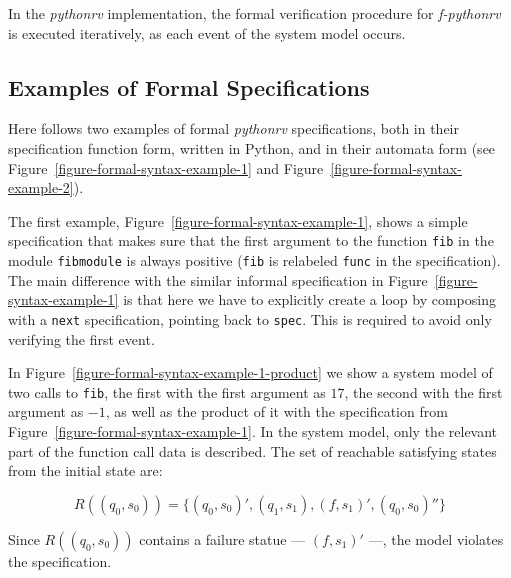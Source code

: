 In the \textit{pythonrv} implementation, the formal verification procedure for
\textit{f-pythonrv} is executed iteratively, as each event of the system model
occurs.





\subsection{Examples of Formal Specifications}
\label{section-approach-examples-of-formal-specifications}
\lstset{language=Python,numbers=none}


Here follows two examples of formal \textit{pythonrv} specifications, both in
their specification function form, written in Python, and in their automata
form (see Figure~\ref{figure-formal-syntax-example-1} and
Figure~\ref{figure-formal-syntax-example-2}).

The first example, Figure~\ref{figure-formal-syntax-example-1}, shows a simple
specification that makes sure that the first argument to the function
\texttt{fib} in the module \texttt{fibmodule} is always positive (\texttt{fib}
is relabeled \texttt{func} in the specification). The main difference with the
similar informal specification in Figure~\ref{figure-syntax-example-1} is that
here we have to explicitly create a loop by composing with a \texttt{next}
specification, pointing back to \texttt{spec}. This is required to avoid only
verifying the first event.

In Figure~\ref{figure-formal-syntax-example-1-product} we show a system model
of two calls to \texttt{fib}, the first with the first argument as $17$, the
second with the first argument as $-1$, as well as the product of it with
the specification from Figure~\ref{figure-formal-syntax-example-1}. In the
system model, only the relevant part of the function call data is described.
The set of reachable satisfying states from the initial state are:

\medskip
\[
  R((q_0,s_0)) = \{(q_0,s_0)', (q_1,s_1), (f,s_1)', (q_0,s_0)''\}
\]
\medskip

Since $R((q_0,s_0))$ contains a failure statue --- $(f,s_1)'$ ---, the model
violates the specification.

